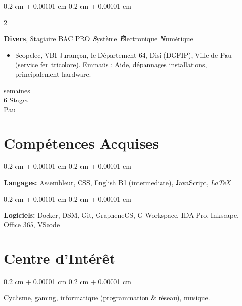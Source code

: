 \documentclass[11pt, a4paper]{article}
\newenvironment{highlights}{
    \begin{itemize}[
        topsep=0.10 cm,
        parsep=0.10 cm,
        partopsep=0pt,
        itemsep=0pt,
        leftmargin=0.4 cm + 10pt
    ]
}{
    \end{itemize}
} %
\newenvironment{onecolentry}{
    \begin{adjustwidth}{
        0.2 cm + 0.00001 cm
    }{
        0.2 cm + 0.00001 cm
    }
}{
    \end{adjustwidth}
} %
\newenvironment{twocolentry}[2][]{
    \onecolentry
    \def\secondColumn{#2}
    \setcolumnwidth{\fill, 4.5 cm}
    \begin{paracol}{2}
}{
    \switchcolumn \raggedleft \secondColumn
    \end{paracol}
    \endonecolentry
} %
\begin{document}
        \begin{twocolentry}{
            25 semaines \\
            6 Stages \\
            \approx Pau
        }
            \textbf{Divers}, Stagiaire BAC PRO \textbf{\textit{S}}ystème \textbf{\textit{É}}lectronique \textbf{\textit{N}}umérique
            \begin{highlights}
                \item Scopelec, VBI Jurançon, le Département 64, Disi (DGFIP), Ville de Pau (service feu tricolore), Emmaüs : Aide, dépannages installations, principalement hardware.
            \end{highlights}
        \end{twocolentry}

    
    \section{Compétences Acquises}
        
        \begin{onecolentry}
            \textbf{Langages:} Assembleur, CSS, English B1 (intermediate), JavaScript, \textit{\LaTeX}
        \end{onecolentry}

        \vspace{0.2 cm}

        \begin{onecolentry}
            \textbf{Logiciels:} Docker, DSM, Git, GrapheneOS, G Workspace, IDA Pro, Inkscape, Office 365, VScode
        \end{onecolentry}


    \section{Centre d'Intérêt}
        \begin{onecolentry}
            Cyclisme, gaming, informatique (programmation \& réseau), musique.
        \end{onecolentry}
    
\end{document}
